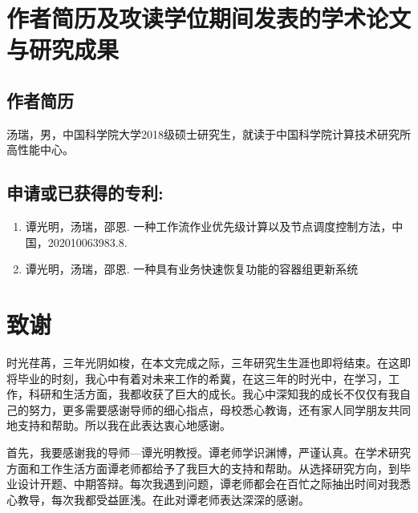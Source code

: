 \chapter{作者简历及攻读学位期间发表的学术论文与研究成果}

\section*{作者简历}

汤瑞，男，中国科学院大学2018级硕士研究生，就读于中国科学院计算技术研究所高性能中心。

\section*{申请或已获得的专利:}

\begin{enumerate}
    \item 谭光明，汤瑞，邵恩. ⼀种⼯作流作业优先级计算以及节点调度控制⽅法，中国，202010063983.8.
    \item 谭光明，汤瑞，邵恩. ⼀种具有业务快速恢复功能的容器组更新系统
\end{enumerate}

\chapter[致谢]{致\quad 谢}%
\thispagestyle{noheaderstyle}%

时光荏苒，三年光阴如梭，在本文完成之际，三年研究生生涯也即将结束。在这即将毕业的时刻，我心中有着对未来工作的希冀，在这三年的时光中，在学习，工作，科研和生活方面，我都收获了巨大的成长。我心中深知我的成长不仅仅有我自己的努力，更多需要感谢导师的细心指点，母校悉心教诲，还有家人同学朋友共同地支持和帮助。所以我在此表达衷心地感谢。

首先，我要感谢我的导师—谭光明教授。谭老师学识渊博，严谨认真。在学术研究方面和工作生活方面谭老师都给予了我巨大的支持和帮助。从选择研究方向，到毕业设计开题、中期答辩。每次我遇到问题，谭老师都会在百忙之际抽出时间对我悉心教导，每次我都受益匪浅。在此对谭老师表达深深的感谢。

